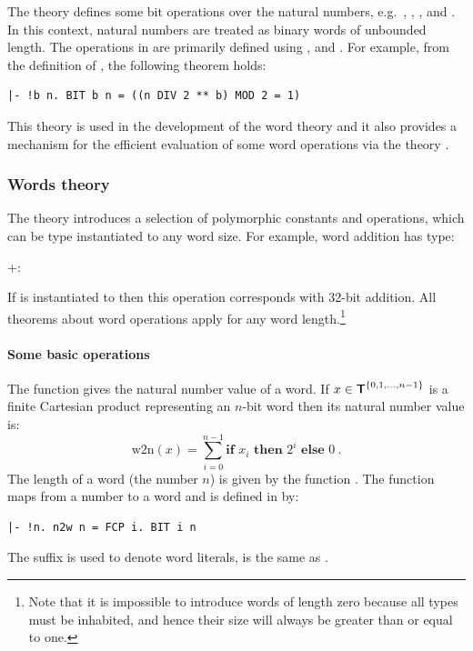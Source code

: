{The theory  defines some bit operations over the natural numbers,
e.g.\ , , ,  and
. In this context, natural numbers are treated as binary words of
unbounded length.  The operations in  are primarily defined using ,  and .  For example, from the definition of , the following theorem holds:
\begin{hol}
\begin{verbatim}
|- !b n. BIT b n = ((n DIV 2 ** b) MOD 2 = 1)
\end{verbatim}
\end{hol}

This theory is used in the development of the word theory and it also provides
a mechanism for the efficient evaluation of some word operations via the theory
.

\subsubsection{Words theory}

The theory  introduces a selection of polymorphic constants and operations, which can be type instantiated to any word size.  For example, word addition
has type:
\begin{hol}
+:\worda\rarr\worda\rarr\worda
\end{hol}
If  is instantiated to  then this operation corresponds with 32-bit addition.
All theorems about word operations apply for any word length.\footnote{Note
that it is impossible to introduce words of length zero because all types
must be inhabited, and hence their size will always be greater than or equal to
one.}

\paragraph{Some basic operations}

The function  gives the natural number value of a
word.  If $x\in\mbox{${\sf T}\!\!\!\!{\sf T}$}^{\{0, 1, \ldots, n - 1\}}$ is a finite Cartesian product
representing an $n$-bit word then its natural number value is:
\[ \mathrm{w2n}(x) = \sum_{i = 0}^{n - 1} \textbf{if } x_i \textbf{ then } 2^i
\textbf{ else } 0\ .\]
The length of a word (the number $n$) is given by the function
.
The function  maps from a number to a word and is
defined in \HOL{} by:
\begin{hol}
\begin{verbatim}
|- !n. n2w n = FCP i. BIT i n
\end{verbatim}
\end{hol}
The suffix  is used to denote word literals, \eg{}
 is the same as .

}
